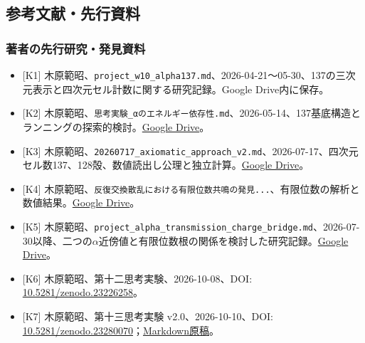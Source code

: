 \documentclass[
  a4paper,
]{ltjsarticle}
\providecommand{\tightlist}{%
  \setlength{\itemsep}{0pt}\setlength{\parskip}{0pt}}
\begin{document}
\subsection{参考文献・先行資料}\label{ux53c2ux8003ux6587ux732eux5148ux884cux8cc7ux6599}

\subsubsection{著者の先行研究・発見資料}\label{ux8457ux8005ux306eux5148ux884cux7814ux7a76ux767aux898bux8cc7ux6599}

\begin{itemize}
\tightlist
\item
  {[}K1{]}
  木原範昭、\texttt{project\_\allowbreak{}w10\_\allowbreak{}alpha137.md}、2026-04-21～05-30、137の三次元表示と四次元セル計数に関する研究記録。Google
  Drive内に保存。
\item
  {[}K2{]}
  木原範昭、\texttt{思考実験\_\allowbreak{}αのエネルギー依存性.md}、2026-05-14、137基底構造とランニングの探索的検討。\href{https://drive.google.com/file/d/1yhH5Wk-Qi2IojaEgZLc_P2V2Z9Cng1nH/view}{Google
  Drive}。
\item
  {[}K3{]}
  木原範昭、\texttt{20260717\_\allowbreak{}axiomatic\_\allowbreak{}approach\_\allowbreak{}v2.md}、2026-07-17、四次元セル数137、128殻、数値読出し公理と独立計算。\href{https://drive.google.com/file/d/1FGNsJHZqMyTWUm6pwqWxDbpfq3BvZa6T/view}{Google
  Drive}。
\item
  {[}K4{]}
  木原範昭、\texttt{反復交換散乱における有限位数共鳴の発見...}、有限位数の解析と数値結果。\href{https://drive.google.com/file/d/1F19s-4mlGYB93IkSYrNtS9CUfGvaOFs3/view}{Google
  Drive}。
\item
  {[}K5{]}
  木原範昭、\texttt{project\_\allowbreak{}alpha\_\allowbreak{}transmission\_\allowbreak{}charge\_\allowbreak{}bridge.md}、2026-07-30以降、二つの\(\alpha\)近傍値と有限位数根の関係を検討した研究記録。\href{https://drive.google.com/file/d/1F2RUrAS7Aj6xTwU9MbVm-JfqW5dgK6yo/view}{Google
  Drive}。
\item
  {[}K6{]} 木原範昭、第十二思考実験、2026-10-08、DOI:
  \href{https://doi.org/10.5281/zenodo.23226258}{10.5281/zenodo.23226258}。
\item
  {[}K7{]} 木原範昭、第十三思考実験 v2.0、2026-10-10、DOI:
  \href{https://doi.org/10.5281/zenodo.23280070}{10.5281/zenodo.23280070}；\href{https://drive.google.com/file/d/10SJBaaaI7OktbwF6-0Q_PYHR8v_XcJr8/view}{Markdown原稿}。
\end{itemize}
\end{document}
